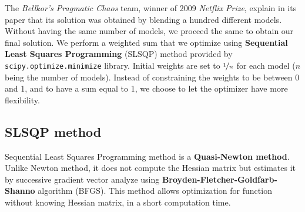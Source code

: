 \documentclass[10pt,conference,compsocconf]{IEEEtran}
\begin{document}
The \textit{Bellkor's Pragmatic Chaos} team, winner of 2009 \textit{Netflix Prize}, explain in its paper that its solution was obtained by blending a hundred different models. \cite{BellKore_netflix} Without having the same number of models, we proceed the same to obtain our final solution. We perform a weighted sum that we optimize using \textbf{Sequential Least Squares Programming} (SLSQP) method provided by \texttt{scipy.optimize.minimize} library. Initial weights are set to $\nicefrac{1}{n}$ for each model ($n$ being the number of models). Instead of constraining the weights to be between 0 and 1, and to have a sum equal to 1, we choose to let the optimizer have more flexibility.

\subsection{SLSQP method}
\label{SLSQP}
Sequential Least Squares Programming method is a \textbf{Quasi-Newton method}. Unlike Newton method, it does not compute the Hessian matrix but estimates it by successive gradient vector analyze \cite{wiki:quasi_newton} using \textbf{Broyden-Fletcher-Goldfarb-Shanno} algorithm (BFGS). This method allows optimization for function without knowing Hessian matrix, in a short computation time.
\end{document}
